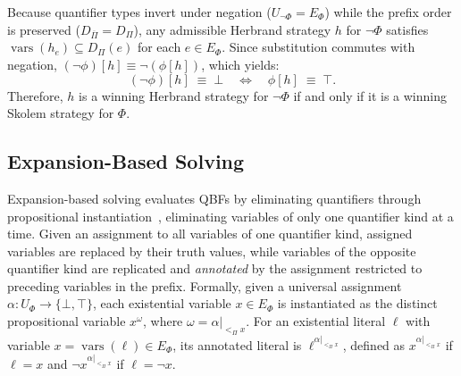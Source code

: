 \documentclass[runningheads]{llncs}
\DeclareMathOperator{\vars}{vars}
\newcommand{\Bool}{\{\bot,\top\}}
\begin{document}
\begin{remark}
    \label{rem:duality}
    Because quantifier types invert under negation ($U_{\neg\Phi} = E_\Phi$) while the prefix order is preserved ($D_{\overline{\Pi}} = D_\Pi$), any admissible Herbrand strategy $h$ for $\neg\Phi$ satisfies $\vars(h_e) \subseteq D_\Pi(e)$ for each $e \in E_\Phi$.
    Since substitution commutes with negation, $(\neg\phi)[h] \equiv \neg(\phi[h])$, which yields:
    \begin{equation}
        (\neg\phi)[h] \;\equiv\; \bot \quad\iff\quad \phi[h] \;\equiv\; \top .
        \label{eq:strategy-duality}
    \end{equation}
    Therefore, $h$ is a winning Herbrand strategy for $\neg\Phi$ if and only if it is a winning Skolem strategy for $\Phi$.
\end{remark}

\subsection{Expansion-Based Solving}
\label{subsec:expansion}

Expansion-based solving evaluates QBFs by eliminating quantifiers through propositional instantiation~\cite{rareqs, ijtihad, janota2015}, eliminating variables of only one quantifier kind at a time.
Given an assignment to all variables of one quantifier kind, assigned variables are replaced by their truth values, while variables of the opposite quantifier kind are replicated and \emph{annotated} by the assignment restricted to preceding variables in the prefix.
Formally, given a universal assignment $\alpha : U_\Phi \to \Bool$, each existential variable $x \in E_\Phi$ is instantiated as the distinct propositional variable $x^\omega$, where $\omega = \alpha|_{<_\Pi x}$.
For an existential literal $\ell$ with variable $x = \vars(\ell) \in E_\Phi$, its annotated literal is $\ell^{\alpha|_{<_\Pi x}}$, defined as $x^{\alpha|_{<_\Pi x}}$ if $\ell = x$ and $\neg x^{\alpha|_{<_\Pi x}}$ if $\ell = \neg x$.
\end{document}
